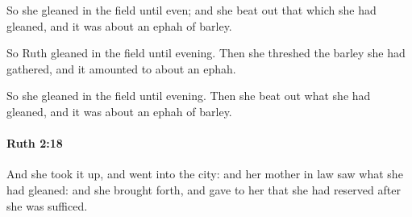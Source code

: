 			\begin{versebox}
					\item[BHS] 
					\item[LXX] 
					\item[ASV] So she gleaned in the field until even; and she beat out that which she had gleaned, and it was about an ephah of barley.
					\item[NIV] So Ruth gleaned in the field until evening. Then she threshed the barley she had gathered, and it amounted to about an ephah.
					\item[NRSV] So she gleaned in the field until evening. Then she beat out what she had gleaned, and it was about an ephah of barley.
			\end{versebox}

		\paragraph{Ruth 2:18} %
			\label{RUTH-2-18}

			And she took it up, and went into the city: and her mother in law saw what she had gleaned: and she brought forth, and gave to her that she had reserved after she was sufficed.

